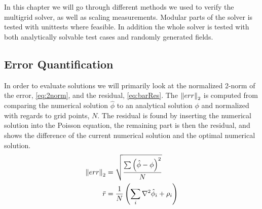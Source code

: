 In this chapter we will go through different methods we used to verify the multigrid
solver, as well as scaling measurements. Modular parts of the solver is tested with unittests
where feasible. In addition the whole solver is tested with both analytically solvable
test cases and randomly generated fields.


\subsection{Error Quantification}
	\label{sec:errorQuant}
	In order to evaluate solutions we will primarily look at the normalized 2-norm of the error, \cref{eq:2norm},
	and the residual, \cref{eq:barRes}. The \(\norm{ err }_2\) is computed from comparing the numerical
	solution \(\hat{\phi}\) to an analytical solution \(\phi\) and normalized with regards to grid points, \(N\).
	The residual is found by inserting the numerical solution into the Poisson equation, the remaining
	part is then the residual, and shows the difference of the current numerical solution
	and the optimal numerical solution.
	\begin{align}
		\norm{ err }_2&= \sqrt{\frac{\sum \left(\hat\phi - \phi\right)^2}{N}}  \label{eq:2norm}
		\\
		\bar{r} &= \frac{1}{N}\left( \sum_i{ \nabla^2 \hat{\phi}_i + \rho_i  }  \right) \label{eq:barRes}
	\end{align}
